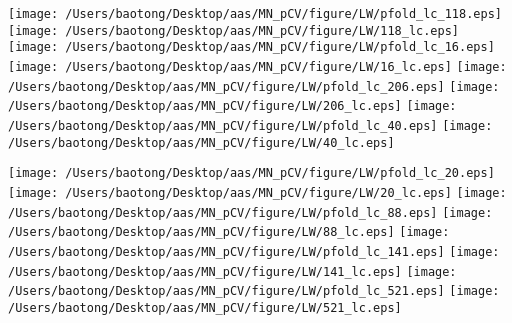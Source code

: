 \documentclass{aastex63}
\begin{document}
\begin{figure*}[!ht]
\centering
\texttt{[image: /Users/baotong/Desktop/aas/MN\_pCV/figure/LW/pfold\_lc\_118.eps]}
\hfill
\texttt{[image: /Users/baotong/Desktop/aas/MN\_pCV/figure/LW/118\_lc.eps]}
\hfill
{}
\texttt{[image: /Users/baotong/Desktop/aas/MN\_pCV/figure/LW/pfold\_lc\_16.eps]}
\hfill
\texttt{[image: /Users/baotong/Desktop/aas/MN\_pCV/figure/LW/16\_lc.eps]}
\hfill
{}
\texttt{[image: /Users/baotong/Desktop/aas/MN\_pCV/figure/LW/pfold\_lc\_206.eps]}
\hfill
\texttt{[image: /Users/baotong/Desktop/aas/MN\_pCV/figure/LW/206\_lc.eps]}
\hfill
{}
\texttt{[image: /Users/baotong/Desktop/aas/MN\_pCV/figure/LW/pfold\_lc\_40.eps]}
\hfill
\texttt{[image: /Users/baotong/Desktop/aas/MN\_pCV/figure/LW/40\_lc.eps]}
\hfill
{}
\end{figure*}
\clearpage
\begin{figure*}[!ht]
\centering
\texttt{[image: /Users/baotong/Desktop/aas/MN\_pCV/figure/LW/pfold\_lc\_20.eps]}
\hfill
\texttt{[image: /Users/baotong/Desktop/aas/MN\_pCV/figure/LW/20\_lc.eps]}
\hfill
{}
\texttt{[image: /Users/baotong/Desktop/aas/MN\_pCV/figure/LW/pfold\_lc\_88.eps]}
\hfill
\texttt{[image: /Users/baotong/Desktop/aas/MN\_pCV/figure/LW/88\_lc.eps]}
\hfill
{}
\texttt{[image: /Users/baotong/Desktop/aas/MN\_pCV/figure/LW/pfold\_lc\_141.eps]}
\hfill
\texttt{[image: /Users/baotong/Desktop/aas/MN\_pCV/figure/LW/141\_lc.eps]}
\hfill
{}
\texttt{[image: /Users/baotong/Desktop/aas/MN\_pCV/figure/LW/pfold\_lc\_521.eps]}
\hfill
\texttt{[image: /Users/baotong/Desktop/aas/MN\_pCV/figure/LW/521\_lc.eps]}
\hfill
{}
\end{figure*}
\end{document}
